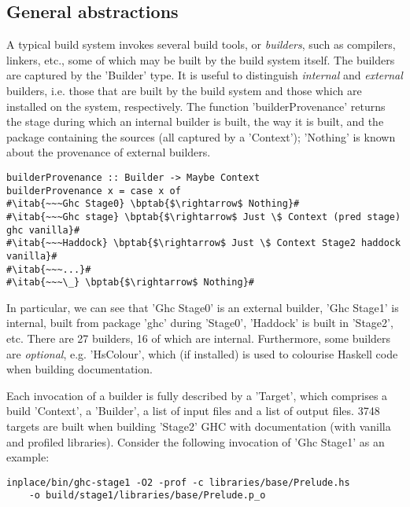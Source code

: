 \subsection{General abstractions}

A typical build system invokes several build tools, or \emph{builders}, such as
compilers, linkers, etc., some of which may be built by the
build system itself. The builders are captured by the \lst'Builder' type. It
is useful to distinguish \emph{internal} and \emph{external} builders, i.e.
those that are built by the build system and those which are installed on the
system, respectively. The function \lst'builderProvenance' returns the stage
during which an internal builder is built, the way it is built, and the package
containing the sources (all captured by a \lst'Context'); \lst'Nothing' is
known about the provenance of external builders.

\newcommand{\bptab}[1]{\hspace{.108\textwidth}\rlap{#1}}

\begin{lstlisting}
builderProvenance :: Builder -> Maybe Context
builderProvenance x = case x of
#\itab{~~~Ghc Stage0} \bptab{$\rightarrow$ Nothing}#
#\itab{~~~Ghc stage} \bptab{$\rightarrow$ Just \$ Context (pred stage) ghc vanilla}#
#\itab{~~~Haddock} \bptab{$\rightarrow$ Just \$ Context Stage2 haddock vanilla}#
#\itab{~~~...}#
#\itab{~~~\_} \bptab{$\rightarrow$ Nothing}#
\end{lstlisting}

\noindent In particular, we can see that \lst'Ghc Stage0' is an external
builder, \lst'Ghc Stage1' is internal, built from package \lst'ghc'
during \lst'Stage0', \lst'Haddock' is built in \lst'Stage2', etc. There are
27 builders, 16 of which are internal. Furthermore, some builders are
\emph{optional}, e.g. \lst'HsColour', which (if installed) is used to
colourise Haskell code when building documentation.

Each invocation of a builder is fully described by a \lst'Target', which
comprises a build \lst'Context', a \lst'Builder', a list of input files and
a list of output files. 3748 targets are built when building \lst'Stage2' GHC
with documentation (with vanilla and profiled libraries). Consider the following
invocation of \lst'Ghc Stage1' as an example:

\begin{lstlisting}
inplace/bin/ghc-stage1 -O2 -prof -c libraries/base/Prelude.hs
    -o build/stage1/libraries/base/Prelude.p_o
\end{lstlisting}

